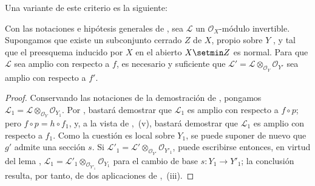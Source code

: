 Una variante de este criterio es la siguiente:

\begin{corollary}[14.5.12]
\label{IV.14.5.12}

Con las notaciones e hipótesis generales de , sea $\mathcal L$ un $\mathcal O_X$-módulo invertible.
Supongamos que existe un subconjunto cerrado $Z$ de $X$, propio sobre $Y$ , y tal que el preesquema inducido por $X$ en el abierto $X\setmin Z$ es normal.
Para que $\mathcal L$ sea amplio con respecto a $f$, es necesario y suficiente que $\mathcal L'=\mathcal L\otimes_{\mathcal O_Y}\mathcal O_{Y'}$ sea amplio con respecto a $f'$.
\end{corollary}

\begin{proof}
Conservando las notaciones de la demostración de , pongamos $\mathcal L_1=\mathcal L\otimes_{\mathcal O_Y}\mathcal O_{Y_1}$.
Por , bastará demostrar que $\mathcal L_1$ es amplio con respecto a $f\circ p$; pero $f\circ p=h\circ f_1$, y, a la vista de ,~(v), bastará demostrar que $\mathcal L_1$ es amplio con respecto a $f_1$.
Como la cuestión es local sobre $Y_1$, se puede suponer de nuevo que $g'$ admite una sección $s$.
Si $\mathcal L'_1=\mathcal L'\otimes_{\mathcal O_{Y'}}\mathcal O_{Y'_1}$, puede escribirse entonces, en virtud del lema , $\mathcal L_1=\mathcal L'_1\otimes_{\mathcal O_{Y'_1}}\mathcal O_{Y_1}$ para el cambio de base $s:Y_1\to Y'_1$; la conclusión resulta, por tanto, de dos aplicaciones de ,~(iii).
\end{proof}
